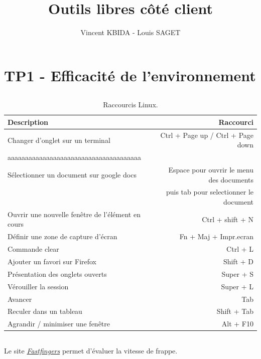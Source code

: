 \documentclass{article}
\title{Outils libres côté client}
\author{Vincent KBIDA - Louis SAGET}
\begin{document}
\maketitle

\section{TP1 - Efficacité de l'environnement}

\subsection{}

\begin{table}[h]
\centering
\begin{tabular}{l|r}

Description & Raccourci \\\hline
Changer d’onglet sur un terminal & Ctrl + Page up / Ctrl + Page down \\aaaaaaaaaaaaaaaaaaaaaaaaaaaaaaaaaaaaaa\\
\hline
Sélectionner un document sur google docs & Espace pour ouvrir le menu des documents \\
\hline
 & puis tab pour selectionner le document \\
 \hline
Ouvrir une nouvelle fenêtre de l’élément en cours & Ctrl + shift + N\\
\hline
Définir une zone de capture d’écran & Fn + Maj + Impr.ecran\\
\hline
Commande clear & Ctrl + L\\
\hline
Ajouter un favori sur Firefox & Shift + D\\
\hline
Présentation des onglets ouverts & Super + S\\
\hline
Vérouiller la session & Super + L\\
\hline
Avancer & Tab\\
\hline
Reculer dans un tableau & Shift + Tab\\
\hline
Agrandir / minimiser une fenêtre & Alt + F10
\hline

\end{tabular}
\caption{\label{tab:widgets}Raccourcis Linux.}
\end{table}

\subsection{}

Le site \href{https://10fastfingers.com/typing-test/french}{\emph{Fastfingers}} permet d’évaluer la vitesse de frappe.
\end{document}
